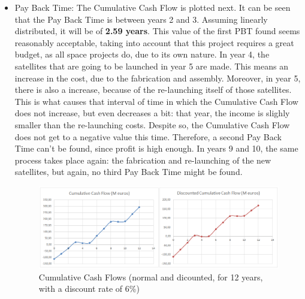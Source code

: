 \begin{itemize}
\item Pay Back Time: The Cumulative Cash Flow is plotted next. It can be seen that the Pay Back Time is between years 2 and 3. Assuming linearly distributed, it will be of \textbf{2.59 years}. This value of the first PBT found seems reasonably acceptable, taking into account that this project requires a great budget, as all space projects do, due to its own nature. In year 4, the satellites that are going to be launched in year 5 are made. This means an increase in the cost, due to the fabrication and assembly. Moreover, in year 5, there is also a increase, because of the re-launching itself of those satellites. This is what causes that interval of time in which the Cumulative Cash Flow does not increase, but even decreases a bit: that year, the income is slighly smaller than the re-launching costs. Despite so, the Cumulative Cash Flow does not get to a negative value this time. Therefore, a second Pay Back Time can't be found, since profit is high enough. In years 9 and 10, the same process takes place again: the fabrication and re-launching of the new satellites, but again, no third Pay Back Time might be found. 

\begin{figure}
	\centering
	\includegraphics[width=140mm]{CCFTogether.png}
	\caption[Cumulative Cash Flows (normal and discounted)]{Cumulative Cash Flows (normal and dicounted, for 12 years, with a discount rate of 6\%)}
\end{figure}




\end{itemize}
